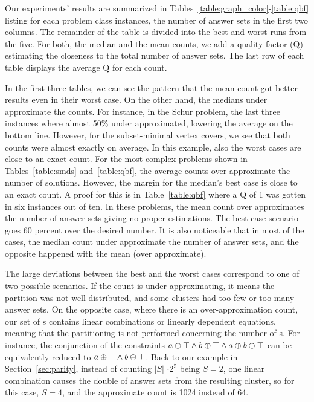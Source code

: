Our experiments' results are summarized in Tables~\ref{table:graph_color}-\ref{table:qbf} listing for each problem class instances, the number of answer sets in the first two columns.
The remainder of the table is divided into the best and worst runs from the five. 
%
For both, the median and the mean counts, we add a quality factor (Q) estimating the closeness to the total number of answer sets.
The last row of each table displays the average Q for each count.


In the first three tables, we can see the pattern that the mean count got better results even in their worst case.
On the other hand, the medians under approximate the counts. For instance, in the Schur problem, the last three instances where almost 50\% under approximated, lowering the average on the bottom line.
%
However, for the subset-minimal vertex covers, we see that both counts were almost exactly on average. In this example, also the worst cases are close to an exact count.
%
For the most complex problems shown in Tables~\ref{table:smds} and~\ref{table:qbf}, the average counts over approximate the number of solutions.
However, the margin for the median's best case is close to an exact count. A proof for this is in Table~\ref{table:qbf} where a Q of 1 was gotten in six instances out of ten.
In these problems, the mean count over approximates the number of answer sets giving no proper estimations. The best-case scenario goes 60 percent over the desired number.
%
It is also noticeable that in most of the cases, the median count under approximate the number of answer sets, and the opposite happened with the mean (over approximate).





The large deviations between the best and the worst cases correspond to one of two possible scenarios.
%
If the count is under approximating,
it means the partition was not well distributed, and some clusters had too few or too many answer sets. 
%
On the opposite case, where there is an over-approximation count,
our set of \XOR{}s contains linear combinations or linearly dependent equations,
meaning that the partitioning is not performed concerning the number of \XOR{}s.
% 
For instance, the conjunction of the \XOR{} constraints $a \oplus \top \land b \oplus \top \land a \oplus b \oplus \top$ can be equivalently reduced to $a \oplus \top \land b \oplus \top$. 
%
Back to our example in Section~\ref{sec:parity}, instead of counting $|S|$ $\cdot 2^5$ being $S=2$,
one linear combination causes the double of answer sets from the resulting cluster, so for this case, $S=4$, and the approximate count is 1024 instead of 64. 




